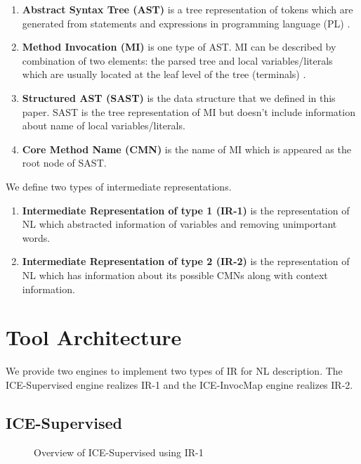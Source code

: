 \documentclass[sigconf,review]{acmart}
\begin{document}
\begin{enumerate}[\indent {}]
\item \textbf{Abstract Syntax Tree (AST)} is a tree representation of tokens which are generated from statements and expressions in programming language (PL) \cite{011}.
\item \textbf{Method Invocation (MI)} is one type of AST. MI can be described by combination of two elements: the parsed tree and local variables/literals which are usually located at the leaf level of the tree (terminals) \cite{012}. 
\item \textbf{Structured AST (SAST)} is the data structure that we defined in this paper. SAST is the tree representation of MI but doesn't include information about name of local variables/literals. 
\item \textbf{Core Method Name (CMN)} is the name of MI which is appeared as the root node of SAST.  
\end{enumerate}
We define two types of intermediate representations.
\begin{enumerate}[\indent {}]
\item \textbf{Intermediate Representation of type 1 (IR-1)} is the representation of NL which abstracted information of variables and removing unimportant words. 
\item \textbf{Intermediate Representation of type 2 (IR-2)} is the representation of NL which has information about its possible CMNs along with context information.
\end{enumerate}

\section{Tool Architecture}
We provide two engines to implement two types of IR for NL description. The ICE-Supervised engine realizes IR-1 and the ICE-InvocMap engine realizes IR-2.
\subsection{ICE-Supervised}
\begin{figure}
   
        \caption{Overview of ICE-Supervised using IR-1}
        \label{figIR1} 
\end{figure}
\end{document}

